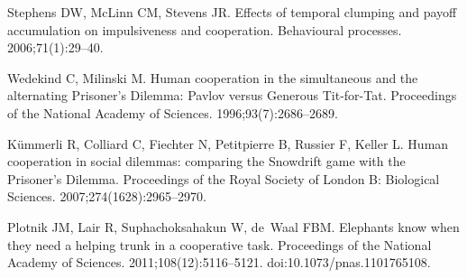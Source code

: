 \documentclass[10pt,letterpaper]{article}
\begin{document}
\begin{thebibliography}{10}
Stephens DW, McLinn CM, Stevens JR.
\newblock Effects of temporal clumping and payoff accumulation on impulsiveness
  and cooperation.
\newblock Behavioural processes. 2006;71(1):29--40.

Wedekind C, Milinski M.
\newblock Human cooperation in the simultaneous and the alternating Prisoner's
  Dilemma: Pavlov versus Generous Tit-for-Tat.
\newblock Proceedings of the National Academy of Sciences.
  1996;93(7):2686--2689.

K{\"u}mmerli R, Colliard C, Fiechter N, Petitpierre B, Russier F, Keller L.
\newblock Human cooperation in social dilemmas: comparing the Snowdrift game
  with the Prisoner's Dilemma.
\newblock Proceedings of the Royal Society of London B: Biological Sciences.
  2007;274(1628):2965--2970.

Plotnik JM, Lair R, Suphachoksahakun W, de~Waal FBM.
\newblock Elephants know when they need a helping trunk in a cooperative task.
\newblock Proceedings of the National Academy of Sciences.
  2011;108(12):5116--5121.
\newblock doi:{10.1073/pnas.1101765108}.

\end{thebibliography}
\end{document}
